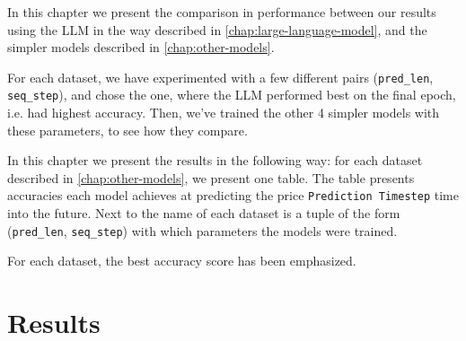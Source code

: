 In this chapter we present the comparison in performance between our results using the LLM in the way described in \autoref{chap:large-language-model}, and the simpler models described in \autoref{chap:other-models}.

For each dataset, we have experimented with a few different pairs (\verb|pred_len|, \verb|seq_step|), and chose the one, where the LLM performed best on the final epoch, i.e. had highest accuracy. Then, we've trained the other 4 simpler models with these parameters, to see how they compare.

In this chapter we present the results in the following way: for each dataset described in \autoref{chap:other-models}, we present one table. The table presents accuracies each model achieves at predicting the price \verb|Prediction Timestep| time into the future. Next to the name of each dataset is a tuple of the form (\verb|pred_len|, \verb|seq_step|) with which parameters the models were trained.

For each dataset, the best accuracy score has been emphasized.

\section{Results}

